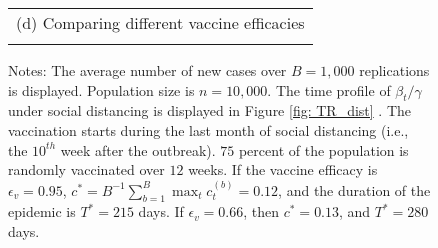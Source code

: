 \documentclass[12pt]{article}
\begin{document}
\begin{figure}[tp]
\begin{footnotesize}
\vspace{0.3cm}%


\begin{center}
%

\begin{tabular}
[c]{c}%
(d) Comparing different vaccine efficacies%
\vspace{0.2cm}%
\\%
{\includegraphics[
height=1.9951in,
width=2.6524in
]%
{figs/theory_cmp_vacc_eff_dist_pct75_Wbeg10_12W_dcT.png}%
}
\end{tabular}



\end{center}

%

\vspace{-0.2cm}%
Notes: The average number of new cases over $B=1,000$ replications is
displayed. Population size is $n=10,000$. The time profile of $\beta
_{t}/\gamma$ under social distancing is displayed in Figure \ref{fig: TR_dist}%
. The vaccination starts during the last month of social distancing (i.e., the
$10^{th}$ week after the outbreak). $75$ percent of the population is randomly
vaccinated over $12$ weeks. If the vaccine efficacy is $\epsilon_{v}=0.95$,
$c^{\ast}=B^{-1}\sum_{b=1}^{B}\max_{t}c_{t}^{(b)}=0.12$, and the duration of
the epidemic is $T^{\ast}=215$ days. If $\epsilon_{v}=0.66$, then $c^{\ast
}=0.13$, and $T^{\ast}=280$ days.%

\end{footnotesize}%
%

\end{figure}%
%
\end{document}
